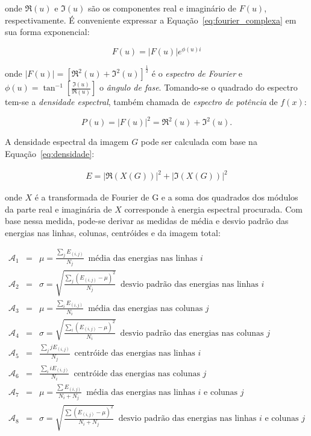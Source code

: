 \noindent onde $\Re(u)$ e $\Im(u)$ são os componentes real e imaginário de
$F(u)$, respectivamente. É conveniente expressar a
Equação~\ref{eq:fourier_complexa} em sua forma exponencial:

\begin{equation}
  F(u) = |F(u)|e^{\phi(u)i}
\end{equation}

\noindent onde $|F(u)| = \left[\Re^2(u) + \Im^2(u)\right]^{\frac{1}{2}}$ é o
\emph{espectro de Fourier} e
$\phi(u) = \tan^{-1}\left[\frac{\Im(u)}{\Re(u)}\right]$ o \emph{ângulo de
  fase}. Tomando-se o quadrado do espectro tem-se a \emph{densidade espectral},
também chamada de \emph{espectro de potência} de $f(x)$:

\begin{equation}
  P(u) = |F(u)|^2 = \Re^2(u) + \Im^2(u).
  \label{eq:densidade}
\end{equation}

A densidade espectral da imagem $G$ pode ser calculada com base na Equação~\ref{eq:densidade}:

\begin{eqnarray}
  E = |\Re(X(G))|^2 + |\Im(X(G))|^2
\end{eqnarray}

\noindent onde $X$ é a transformada de Fourier de G e a soma dos quadrados dos
módulos da parte real e imaginária de $X$ corresponde à energia espectral
procurada. Com base nessa medida, pode-se derivar as medidas de média e desvio
padrão das energias nas linhas, colunas, centróides e da imagem total:

\begin{eqnarray}
  \mathcal{A}_1 &=& \mu = \frac{\sum_j E_{(i,j)}}{N_j} \, \, \, \text{média das energias
    nas linhas $i$} \\
  \mathcal{A}_2 &=& \sigma = \sqrt{\frac{\sum_j (E_{(i,j)} - \mu)^2}{N_j}} \, \, \,
  \text{desvio padrão das energias nas linhas $i$} \\
  \mathcal{A}_3 &=& \mu = \frac{\sum_i E_{(i,j)}}{N_i} \, \, \, \text{média das energias
    nas colunas $j$} \\
  \mathcal{A}_4 &=& \sigma = \sqrt{\frac{\sum_i (E_{(i,j)} - \mu)^2}{N_i}} \, \, \,
  \text{desvio padrão das energias nas colunas $j$} \\
  \mathcal{A}_5 &=& \frac{\sum_j j E_{(i,j)}}{N_j} \, \, \, \text{centróide das energias
    nas linhas $i$} \\
  \mathcal{A}_6 &=& \frac{\sum_i i E_{(i,j)}}{N_i} \, \, \, \text{centróide das energias
    nas colunas $j$} \\
  \mathcal{A}_7 &=& \mu = \frac{\sum E_{(i,j)}}{N_i + N_j} \, \, \, \text{média das energias
    nas linhas $i$ e colunas $j$} \\
  \mathcal{A}_8 &=& \sigma = \sqrt{\frac{\sum (E_{(i,j)} - \mu)^2}{N_i + N_j}} \, \, \,
  \text{desvio padrão das energias nas linhas $i$ e colunas $j$}
\end{eqnarray}


